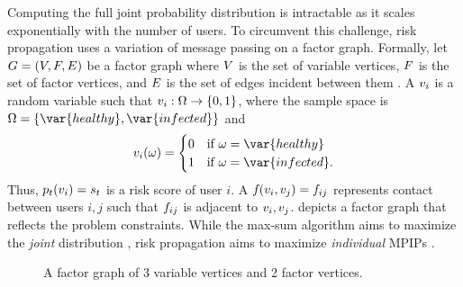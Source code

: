 Computing the full joint probability distribution is intractable as it scales exponentially with the number of users. To circumvent this challenge, risk propagation uses a variation of message passing on a factor graph. Formally, let $G = (V, F, E)$ be a factor graph where $V$ is the set of variable vertices, $F$ is the set of factor vertices, and $E$ is the set of edges incident between them \cite{Kschischang2001}. A  $v_{i}$ is a random variable such that $v_{i}: \Omega \rightarrow \{0, 1\}$, where the sample space is $\eventspace = \{\var{healthy}, \var{infected}\}$ and
%
\begin{equation*}
    \vVariable{i}(\event) =
        \begin{cases}
            0 & \text{if } \event = \var{healthy} \\
            1 & \text{if } \event = \var{infected}.
        \end{cases}
\end{equation*}
%
Thus, $p_t(v_{i}) = s_t$ is a risk score of user $i$. A  $f_{}(v_{i}, v_{j}) = f_{ij}$ represents contact between users $i, j$ such that $f_{ij}$ is adjacent to $v_{i}, v_{j}$.  depicts a factor graph that reflects the problem constraints. 
While the max-sum algorithm aims to maximize the \emph{joint} distribution \cite[pp. 411--415]{Bishop2006}, risk propagation aims to maximize \emph{individual} MPIPs \cite{Ayday2021}.
%
\begin{figure}[htbp]
    \centering
    \caption[Factor graph]{A factor graph of 3 variable vertices and 2 factor vertices.}
    \label{fig:factor-graph}
\end{figure}
